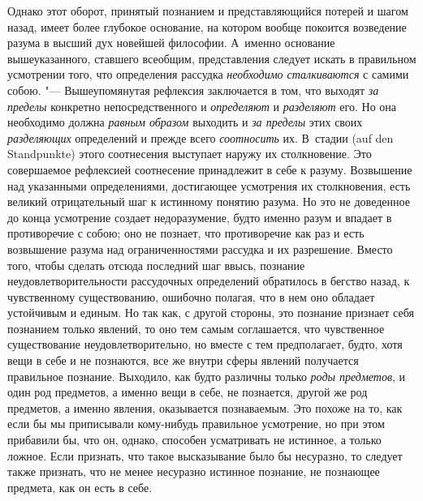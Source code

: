 Однако этот оборот, принятый познанием и представляющийся потерей и шагом
назад, имеет более глубокое основание, на котором вообще покоится
возведение разума в высший дух новейшей философии. А~именно основание
вышеуказанного, ставшего всеобщим, представления следует искать в
правильном усмотрении того, что определения рассудка
{\em необходимо сталкиваются} с самими собою. "---
Вышеупомянутая рефлексия заключается в том, что выходят
{\em за пределы} конкретно непосредственного и
{\em определяют} и {\em разделяют}
его. Но она необходимо должна {\em равным образом}
выходить и {\em за пределы} этих своих
{\em разделяющих} определений и прежде всего
{\em соотносить} их. В~стадии (auf den Standpunkte)
этого соотнесения выступает наружу их столкновение. Это совершаемое
рефлексией соотнесение принадлежит в себе к разуму. Возвышение над
указанными определениями, достигающее усмотрения их столкновения, есть
великий отрицательный шаг к истинному понятию разума. Но это не доведенное
до конца усмотрение создает недоразумение, будто именно разум и впадает в
противоречие с собою; оно не познает, что противоречие как раз и есть
возвышение разума над ограниченностями рассудка и их разрешение. Вместо
того, чтобы сделать отсюда последний шаг ввысь, познание
неудовлетворительности рассудочных определений обратилось в бегство назад,
к чувственному существованию, ошибочно полагая, что в нем оно обладает
устойчивым и единым. Но так как, с другой стороны, это познание признает
себя познанием только явлений, то оно тем самым соглашается, что
чувственное существование неудовлетворительно, но вместе с тем
предполагает, будто, хотя вещи в себе и не познаются, все же внутри сферы
явлений получается правильное познание. Выходило, как будто различны только
{\em роды предметов}, и один род предметов, а именно
вещи в себе, не познается, другой же род предметов, а именно явления,
оказывается познаваемым. Это похоже на то, как если бы мы приписывали
кому-нибудь правильное усмотрение, но при этом прибавили бы, что он,
однако, способен усматривать не истинное, а только ложное. Если признать,
что такое высказывание было бы несуразно, то следует также признать, что не
менее несуразно истинное познание, не познающее предмета, как он есть в себе.

